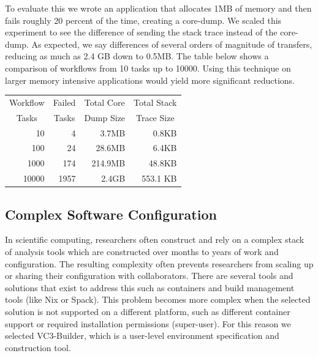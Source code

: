 \documentclass[conference]{IEEEtran}
\begin{document}
To evaluate this we wrote an application
that
allocates 1MB of memory and then
fails roughly 20 percent
of the time, creating a core-dump. 
We scaled this experiment to see the 
difference of sending the 
stack trace instead of the core-dump.
As expected, we say differences of
several orders of magnitude of transfers,
reducing as much as 2.4 GB down to 0.5MB.
The table below shows a comparison
of workflows from 10 tasks up to 10000.
Using this technique on larger memory
intensive applications would yield 
more significant reductions.

\begin{center}
\begin{tabular}{| r | r | r | r |}
\hline
\multicolumn{1}{|c|}{Workflow} & \multicolumn{1}{|c|}{Failed} & \multicolumn{1}{|c|}{Total Core} & \multicolumn{1}{|c|}{Total Stack} \\
\multicolumn{1}{|c|}{Tasks}    & \multicolumn{1}{|c|}{Tasks}  & \multicolumn{1}{|c|}{Dump Size}  & \multicolumn{1}{|c|}{Trace Size} \\ \hline
10 & 4 & 3.7MB & 0.8KB \\ \hline
100 & 24 & 28.6MB & 6.4KB\\ \hline
1000 & 174 & 214.9MB & 48.8KB \\ \hline
10000 & 1957 & 2.4GB & 553.1 KB \\ \hline
\end{tabular}
\end{center}


\subsection{Complex Software Configuration}

In scientific computing, researchers often construct
and rely on a complex stack of analysis tools
which are constructed over
months to years of work and configuration.
The resulting complexity often prevents researchers from
scaling up or sharing their configuration with
collaborators.
There are several tools and solutions that exist
to address this such as containers and build management
tools (like Nix\cite{Dolstra:2004:NSP:1052676.1052686} or 
Spack\cite{Gamblin:2015:SPM:2807591.2807623}).
This problem becomes more complex when the selected
solution is not supported on a different platform,
such as different container support or
required installation permissions (super-user).
For this reason we selected VC3-Builder\cite{tovar-ic2e-2018},
which is a user-level environment specification
and construction tool.
\end{document}
